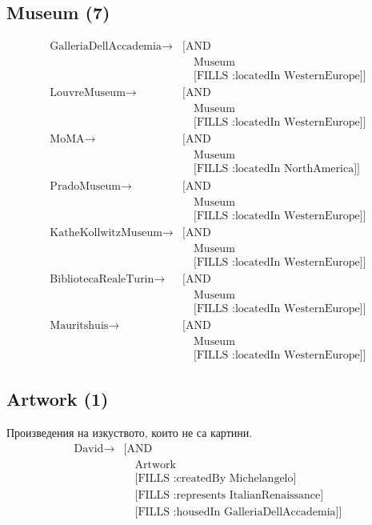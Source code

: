     \subsection{Museum (7)}
    \begin{align*}
    \text{GalleriaDellAccademia} \to& \text{[AND} \\
    &\quad \text{Museum} \\
    &\quad \text{[FILLS :locatedIn WesternEurope]]} \\
    \text{LouvreMuseum} \to& \text{[AND} \\
    &\quad \text{Museum} \\
    &\quad \text{[FILLS :locatedIn WesternEurope]]} \\
    \text{MoMA} \to& \text{[AND} \\
    &\quad \text{Museum} \\
    &\quad \text{[FILLS :locatedIn NorthAmerica]]} \\
    \text{PradoMuseum} \to& \text{[AND} \\
    &\quad \text{Museum} \\
    &\quad \text{[FILLS :locatedIn WesternEurope]]} \\
    \text{KatheKollwitzMuseum} \to& \text{[AND} \\
    &\quad \text{Museum} \\
    &\quad \text{[FILLS :locatedIn WesternEurope]]} \\
    \text{BibliotecaRealeTurin} \to& \text{[AND} \\
    &\quad \text{Museum} \\
    &\quad \text{[FILLS :locatedIn WesternEurope]]} \\
    \text{Mauritshuis} \to& \text{[AND} \\
    &\quad \text{Museum} \\
    &\quad \text{[FILLS :locatedIn WesternEurope]]}
    \end{align*}
    
    \subsection{Artwork (1)}
    Произведения на изкуството, които не са картини.
    \begin{align*}
      \text{David} \to& \text{[AND}\\
      &\quad\text{Artwork}\\
      &\quad\text{[FILLS :createdBy Michelangelo]}\\
      &\quad\text{[FILLS :represents ItalianRenaissance]}\\
      &\quad\text{[FILLS :housedIn GalleriaDellAccademia]]}
    \end{align*}
